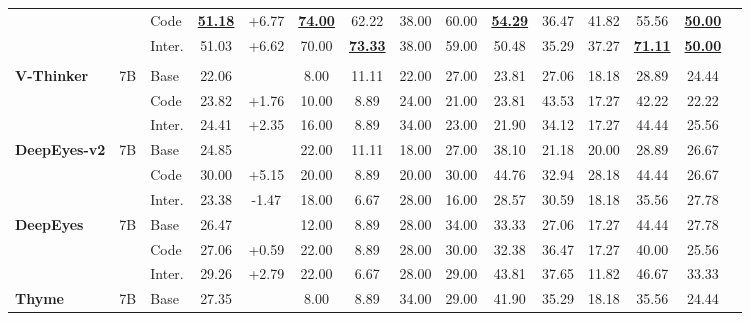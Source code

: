 \documentclass[runningheads]{llncs}
\newcommand{\best}[1]{\textbf{\underline{#1}}}
\begin{document}
\begin{table}[htbp]
{\begin{tabular}{lll c c cccccccccc}
     & & Code & \cellcolor{bgGain}\best{51.18} & \cellcolor{bgGain}+6.77 & \cellcolor{yellow!40}\best{74.00} & \cellcolor{yellow!40}62.22 & 38.00 & 60.00 & \best{54.29} & 36.47 & 41.82 & 55.56 & \cellcolor{yellow!40}\best{50.00} \\
    &  & Inter. & \cellcolor{bgGain}51.03 & \cellcolor{bgGain}+6.62 & \cellcolor{yellow!40}70.00 & \cellcolor{yellow!40}\best{73.33} & 38.00 & 59.00 & 50.48 & 35.29 & 37.27 & \cellcolor{yellow!40}\best{71.11} & \cellcolor{yellow!40}\best{50.00} \\
    \addlinespace
    \midrule
    \rowcolor{gray!15} \multicolumn{14}{c}{\textbf{Category 3: Open-source Tool-use Models}} \\
    \midrule
    \textbf{V-Thinker} & 7B & Base & 22.06 & & 8.00 & 11.11 & 22.00 & 27.00 & 23.81 & 27.06 & 18.18 & 28.89 & 24.44 \\
     & & Code & \cellcolor{bgGain}23.82 & \cellcolor{bgGain}+1.76 & 10.00 & 8.89 & 24.00 & 21.00 & 23.81 & \cellcolor{yellow!40}43.53 & 17.27 & \cellcolor{yellow!40}42.22 & 22.22 \\
     & & Inter. & \cellcolor{bgGain}24.41 & \cellcolor{bgGain}+2.35 & 16.00 & 8.89 & \cellcolor{yellow!40}34.00 & 23.00 & 21.90 & 34.12 & 17.27 & \cellcolor{yellow!40}44.44 & 25.56 \\
    \addlinespace
    \textbf{DeepEyes-v2} & 7B & Base & 24.85 & & 22.00 & 11.11 & 18.00 & 27.00 & 38.10 & 21.18 & 20.00 & 28.89 & 26.67 \\
     & & Code & \cellcolor{bgGain}30.00 & \cellcolor{bgGain}+5.15 & 20.00 & 8.89 & 20.00 & 30.00 & 44.76 & \cellcolor{yellow!40}32.94 & 28.18 & \cellcolor{yellow!40}44.44 & 26.67 \\
     & & Inter. & \cellcolor{bgLoss}23.38 & \cellcolor{bgLoss}-1.47 & 18.00 & 6.67 & 28.00 & 16.00 & 28.57 & 30.59 & 18.18 & 35.56 & 27.78 \\
    \addlinespace
    \textbf{DeepEyes} & 7B & Base & 26.47 & & 12.00 & 8.89 & 28.00 & 34.00 & 33.33 & 27.06 & 17.27 & 44.44 & 27.78 \\
     & & Code & \cellcolor{bgGain}27.06 & \cellcolor{bgGain}+0.59 & 22.00 & 8.89 & 28.00 & 30.00 & 32.38 & 36.47 & 17.27 & 40.00 & 25.56 \\
     & & Inter. & \cellcolor{bgGain}29.26 & \cellcolor{bgGain}+2.79 & 22.00 & 6.67 & 28.00 & 29.00 & \cellcolor{yellow!40}43.81 & \cellcolor{yellow!40}37.65 & 11.82 & 46.67 & 33.33 \\
    \addlinespace
    \textbf{Thyme} & 7B & Base & 27.35 & & 8.00 & 8.89 & 34.00 & 29.00 & 41.90 & 35.29 & 18.18 & 35.56 & 24.44 \\

\end{tabular}}
\end{table}
\end{document}
